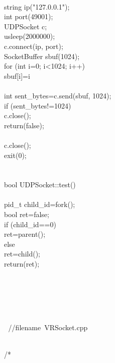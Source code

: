 \documentclass{article}
\begin{document}
 {
\\
     string ip("127.0.0.1");
\\
     int port(49001);
\\
     UDPSocket c;
\\
     usleep(2000000);
\\
     c.connect(ip, port);
\\
     SocketBuffer sbuf(1024);
\\
     for (int i=0; i<1024; i++) {
\\
         sbuf[i]=i%
\\
     }
\\
     int sent_bytes=c.send(sbuf, 1024);
\\
     if (sent_bytes!=1024) {
\\
                 c.close();
\\
         return(false);
\\
         }
\\
     c.close();
\\
     exit(0);
\\
 }
\\
 
\\
 bool UDPSocket::test()
\\
 {   
\\
     pid_t child_id=fork();
\\
     bool ret=false;
\\
     if (child_id==0)
\\
         ret=parent();
\\
     else
\\
         ret=child();
\\
     return(ret);
\\
 }
\\
 
\\
\strut\\
\strut\goodbreak
{}\strut\nopagebreak\\
 
\hbox{//$$filename VRSocket.cpp}\strut\\
\hbox{/*}
\end{document}
